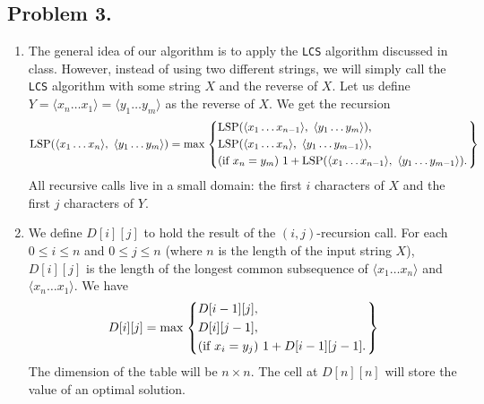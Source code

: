 \documentclass[11pt, letterpaper, titlepage]{article}
\begin{document}
\newpage

\subsection*{Problem 3.}
\begin{enumerate}[label=\alph*.]
    \item The general idea of our algorithm is to apply the \texttt{LCS} algorithm discussed in class. However, instead of using two different strings, we will simply call the \texttt{LCS} algorithm with some string $X$ and the reverse of $X$. Let us define $Y = \langle x_n \ldots x_1 \rangle = \langle y_1 \ldots y_m \rangle$ as the reverse of $X$. We get the recursion 
    \begin{equation}
        \text{LSP}(\langle x_1 \ldots x_n \rangle,\ \langle y_1 \ldots y_m \rangle) = \text{max}
        \begin{rcases}
        \begin{dcases}
            \text{LSP}(\langle x_1 \ldots x_{n - 1} \rangle,\ \langle y_1 \ldots y_m \rangle), \\
            \text{LSP}(\langle x_1 \ldots x_n \rangle,\ \langle y_1 \ldots y_{m - 1} \rangle), \\
            \text{(if $x_n = y_m$) } 1 + \text{LSP}(\langle x_1 \ldots x_{n - 1} \rangle,\ \langle y_1 \ldots y_{m - 1} \rangle).
        \end{dcases}
        \end{rcases}
    \end{equation}
    All recursive calls live in a small domain: the first $i$ characters of $X$ and the first $j$ characters of $Y$.
    
    \item We define $D[i][j]$ to hold the result of the $(i,j)$-recursion call. For each $0 \leq i \leq n$ and $0 \leq j \leq n$ (where $n$ is the length of the input string $X$), $D[i][j]$ is the length of the longest common subsequence of $\langle x_1 \ldots x_n \rangle$ and $\langle x_n \ldots x_1 \rangle$. We have 
    \begin{equation}
        D[i][j] = \text{max}
        \begin{rcases}
        \begin{dcases}
            D[i - 1][j], \\
            D[i][j - 1], \\
            \text{(if $x_i = y_j$) } 1 + D[i - 1][j - 1].
        \end{dcases}
        \end{rcases} 
    \end{equation}
    The dimension of the table will be $n \times n$. The cell at $D[n][n]$ will store the value of an optimal solution.


\end{enumerate}
\end{document}
